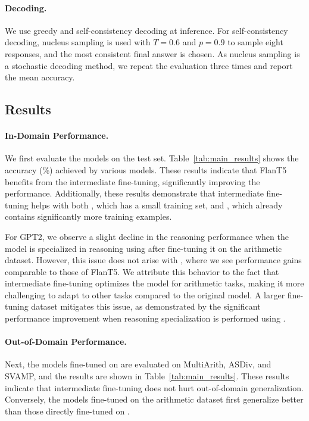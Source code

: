 

\paragraph{Decoding.}
We use greedy and self-consistency decoding at inference. For self-consistency decoding, nucleus sampling \citep{holtzman2019curious} is used with $T = 0.6$ and $p = 0.9$ to sample eight responses, and the most consistent final answer is chosen. As nucleus sampling is a stochastic decoding method, we repeat the evaluation three times and report the mean accuracy.

\subsection{Results}
\paragraph{In-Domain Performance.}
We first evaluate the models on the \gsm{} test set. Table~\ref{tab:main_results} shows the accuracy (\%) achieved by various models. These results indicate that FlanT5 benefits from the intermediate fine-tuning, significantly improving the \gsm{} performance. Additionally, these results demonstrate that intermediate fine-tuning helps with both \gsmo{}, which has a small training set, and \gsmd{}, which already contains significantly more training examples.

For GPT2, we observe a slight decline in the reasoning performance when the model is specialized in reasoning using \gsmo{} after fine-tuning it on the arithmetic dataset. However, this issue does not arise with \gsmd{}, where we see performance gains comparable to those of FlanT5. We attribute this behavior to the fact that intermediate fine-tuning optimizes the model for arithmetic tasks, making it more challenging to adapt to other tasks compared to the original model. A larger fine-tuning dataset mitigates this issue, as demonstrated by the significant performance improvement when reasoning specialization is performed using \gsmd{}.

\paragraph{Out-of-Domain Performance.}
Next, the models fine-tuned on \gsm{} are evaluated on MultiArith, ASDiv, and SVAMP, and the results are shown in Table~\ref{tab:main_results}. These results indicate that intermediate fine-tuning does not hurt out-of-domain generalization. Conversely, the models fine-tuned on the arithmetic dataset first generalize better than those directly fine-tuned on \gsm{}.

